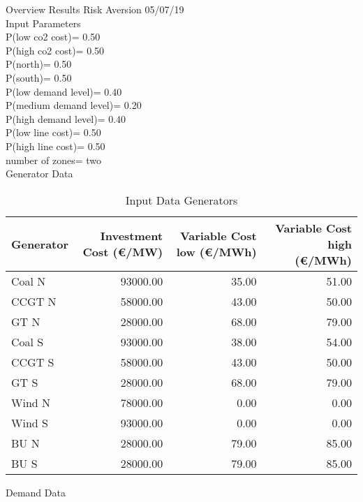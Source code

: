 \documentclass[landscape]{article}
\begin{document}
Overview Results Risk Aversion 05/07/19\\
Input Parameters\\
P(low co2 cost)=         0.50\\
P(high co2 cost)=         0.50\\
P(north)=         0.50\\
P(south)=         0.50\\
P(low demand level)=         0.40\\
P(medium demand level)=         0.20\\
P(high demand level)=         0.40\\
P(low line cost)=         0.50\\
P(high line cost)=         0.50\\
number of zones= two\\
Generator Data\\
\begin{table}[htb]\caption{Input Data Generators}
\begin{tabular}{lrrr}
\toprule
Generator & Investment Cost (\euro/MW) & Variable Cost low (\euro/MWh) & Variable Cost high (\euro/MWh) \\
\midrule
Coal N &    93000.00&       35.00&       51.00\\
CCGT N &    58000.00&       43.00&       50.00\\
GT N &    28000.00&       68.00&       79.00\\
Coal S &    93000.00&       38.00&       54.00\\
CCGT S &    58000.00&       43.00&       50.00\\
GT S &    28000.00&       68.00&       79.00\\
Wind N &    78000.00&        0.00&        0.00\\
Wind S &    93000.00&        0.00&        0.00\\
BU N &    28000.00&       79.00&       85.00\\
BU S &    28000.00&       79.00&       85.00\\
\bottomrule
\end{tabular}
\end{table}
Demand Data\\
\end{document}
